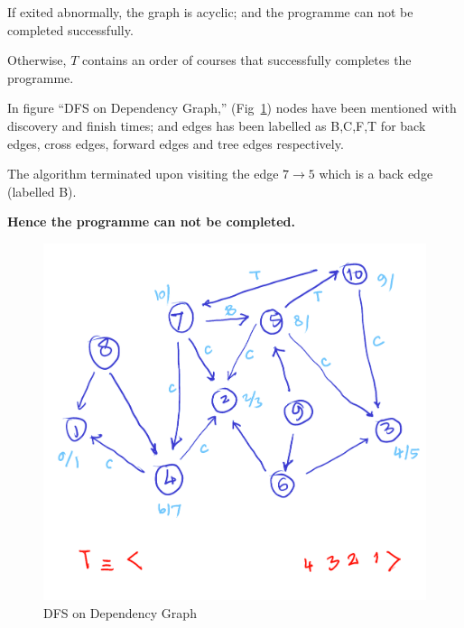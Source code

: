 \documentclass[11pt]{article}
\begin{document}
If exited abnormally, the graph is acyclic; and the
programme can not be completed successfully.

Otherwise, \(T\) contains an order of courses that
successfully completes the programme.

In figure “DFS on Dependency Graph,”
(Fig~\ref{fig:dfsOnDependencyGraph}) nodes
have been mentioned with discovery and finish times;
and edges has been labelled as B,C,F,T for back edges,
cross edges, forward edges and tree edges respectively.

The algorithm terminated upon visiting the edge \(7\to
5\) which is a back edge (labelled B).

\textbf{Hence the programme can not be completed.}
\begin{figure}[htbp]
\centering
\includegraphics[width=.9\linewidth]{images/dfsOnDependencyGraph.png}
\caption{\label{fig:dfsOnDependencyGraph}DFS on Dependency Graph}
\end{figure}
\end{document}

